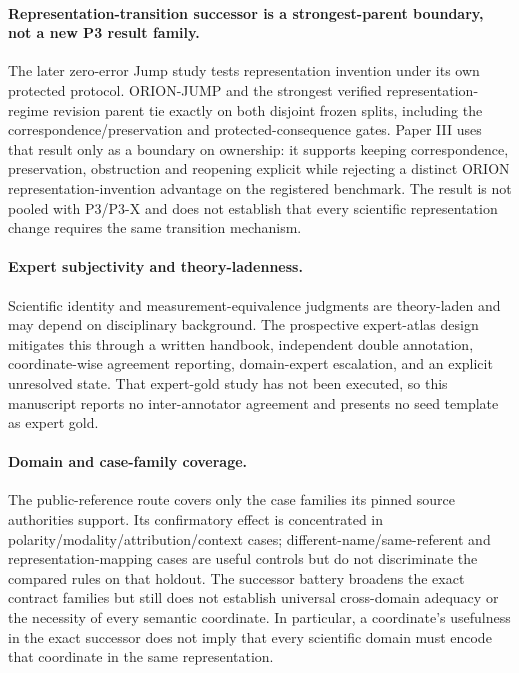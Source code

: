 \paragraph{Representation-transition successor is a strongest-parent boundary, not a new P3 result family.}
The later zero-error Jump study tests representation invention under its own protected protocol. ORION-JUMP and the strongest verified representation-regime revision parent tie exactly on both disjoint frozen splits, including the correspondence/preservation and protected-consequence gates. Paper III uses that result only as a boundary on ownership: it supports keeping correspondence, preservation, obstruction and reopening explicit while rejecting a distinct ORION representation-invention advantage on the registered benchmark. The result is not pooled with P3/P3-X and does not establish that every scientific representation change requires the same transition mechanism.

\paragraph{Expert subjectivity and theory-ladenness.}
Scientific identity and measurement-equivalence judgments are theory-laden and
may depend on disciplinary background. The prospective expert-atlas design
mitigates this through a written handbook, independent double annotation,
coordinate-wise agreement reporting, domain-expert escalation, and an explicit
unresolved state. That expert-gold study has not been executed, so this
manuscript reports no inter-annotator agreement and presents no seed template
as expert gold.

\paragraph{Domain and case-family coverage.}
The public-reference route covers only the case families its pinned source
authorities support. Its confirmatory effect is concentrated in
polarity/modality/attribution/context cases; different-name/same-referent and
representation-mapping cases are useful controls but do not discriminate the
compared rules on that holdout. The successor battery broadens the exact
contract families but still does not establish universal cross-domain adequacy
or the necessity of every semantic coordinate. In particular, a coordinate's
usefulness in the exact successor does not imply that every scientific domain
must encode that coordinate in the same representation.

